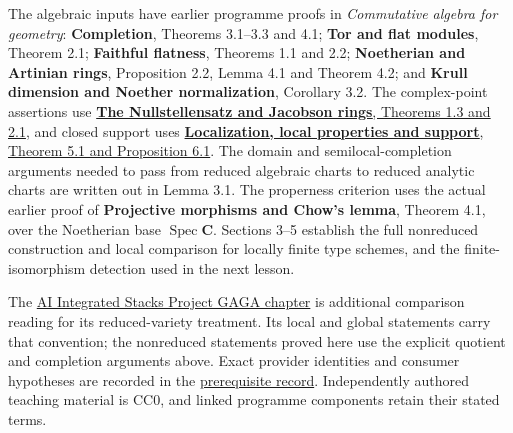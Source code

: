 \documentclass[11pt]{article}
\begin{document}
The algebraic inputs have earlier programme proofs in \emph{Commutative
algebra for geometry}: \textbf{Completion}, Theorems 3.1--3.3 and 4.1;
\textbf{Tor and flat modules}, Theorem 2.1; \textbf{Faithful flatness},
Theorems 1.1 and 2.2; \textbf{Noetherian and Artinian rings},
Proposition 2.2, Lemma 4.1 and Theorem 4.2; and \textbf{Krull dimension
and Noether normalization}, Corollary 3.2. The complex-point assertions
use \href{../../AG-CA/AG-CA-06.html}{\textbf{The Nullstellensatz and
Jacobson rings}, Theorems 1.3 and 2.1}, and closed support uses
\href{../../AG-CA/AG-CA-02.html}{\textbf{Localization, local properties and
support}, Theorem 5.1 and Proposition 6.1}. The domain and
semilocal-completion arguments needed to pass from reduced algebraic
charts to reduced analytic charts are written out in Lemma 3.1. The
properness criterion uses the actual earlier proof of \textbf{Projective
morphisms and Chow's lemma}, Theorem 4.1, over the Noetherian base
\(\operatorname{Spec}\mathbf C\). Sections 3--5 establish the full
nonreduced construction and local comparison for locally finite type
schemes, and the finite-isomorphism detection used in the next lesson.

The
\href{https://kokunoyumeto.github.io/stacks-zh-hans-cn/en/gaga.html\#gaga-proposition-analytification}{AI
Integrated Stacks Project GAGA chapter} is additional comparison reading
for its reduced-variety treatment. Its local and global statements carry
that convention; the nonreduced statements proved here use the explicit
quotient and completion arguments above. Exact provider identities and
consumer hypotheses are recorded in the
\href{../prerequisites.json}{prerequisite record}. Independently authored
teaching material is CC0, and linked programme components retain their
stated terms.
\end{document}
